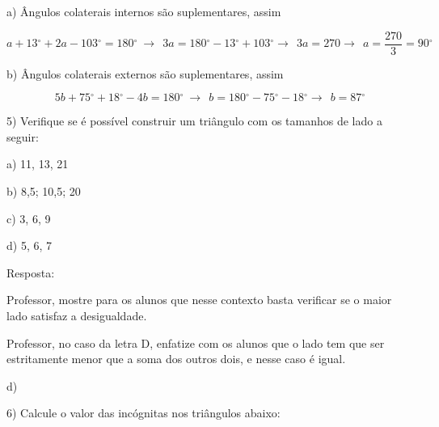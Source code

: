 a) Ângulos colaterais internos são suplementares, assim

\[a + 13{^\circ} + 2a - 103{^\circ} = 180{^\circ}\  \rightarrow \ \ 3a = 180{^\circ} - 13{^\circ} + 103{^\circ} \rightarrow \ \ 3a = 270 \rightarrow \ \ a = \frac{270}{3} = 90{^\circ}\]

b) Ângulos colaterais externos são suplementares, assim

\[5b + 75{^\circ} + 18{^\circ} - 4b = 180{^\circ}\  \rightarrow \ \ b = 180{^\circ} - 75{^\circ} - 18{^\circ} \rightarrow \ \ b = 87{^\circ}\]

5) Verifique se é possível construir um triângulo com os tamanhos de
lado a seguir:

a) 11, 13, 21

b) 8,5; 10,5; 20

c) 3, 6, 9

d) 5, 6, 7

Resposta:

Professor, mostre para os alunos que nesse contexto basta verificar se o
maior lado satisfaz a desigualdade.




Professor, no caso da letra D, enfatize com os alunos que o lado tem que
ser estritamente menor que a soma dos outros dois, e nesse caso é igual.

d)

6) Calcule o valor das incógnitas nos triângulos abaixo:

